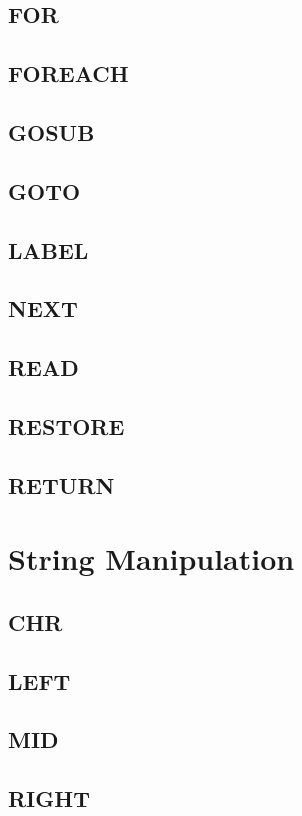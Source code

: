     \subsection{FOR}
    \subsection{FOREACH}
    \subsection{GOSUB}
    \subsection{GOTO}
    \subsection{LABEL}
    \subsection{NEXT}
    \subsection{READ}
    \subsection{RESTORE}
    \subsection{RETURN}

\section{String Manipulation}

    \subsection{CHR}
    \subsection{LEFT}
    \subsection{MID}
    \subsection{RIGHT}
